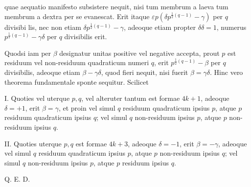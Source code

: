 quae aequatio manifesto subsistere nequit, nisi tum membrum a laeva tum membrum a dextra per se evanescat. Erit itaque $\varepsilon p(\delta p^{\frac12(q-1)}-\gamma)$ per $q$ divisibi%
%
lis, nec non etiam $\delta p^{\frac12(q-1)}-\gamma$, adeoque etiam propter $\delta\delta=1$, numerus $p^{\frac12(q-1)}-\gamma\delta$ per $q$ divisibilis erit.

Quodsi iam per $\beta$ designatur unitas positive vel negative accepta, prout $p$ est residuum vel non-residuum quadraticum numeri $q$, erit $p^{\frac12(q-1)}-\beta$ per $q$ divisibilis, adeoque etiam $\beta-\gamma\delta$, quod fieri nequit, nisi fuerit $\beta=\gamma\delta$. Hinc vero theorema fundamentale sponte sequitur. Scilicet

I. Quoties vel uterque $p,q$, vel alteruter tantum est formae $4k+1$, adeoque $\delta=+1$, erit $\beta=\gamma$, et proin vel simul $q$ residuum quadraticum ipsius $p$, atque $p$ residuum quadraticum ipsius $q$; vel simul $q$ non-residuum ipsius $p$, atque $p$ non-residuum ipsius $q$.

II. Quoties uterque $p,q$ est formae $4k+3$, adeoque $\delta=-1$, erit $\beta=-\gamma$, adeoque vel simul $q$ residuum quadraticum ipsius $p$, atque $p$ non-residuum ipsius $q$; vel simul $q$ non-residuum ipsius $p$, atque $p$ residuum ipsius $q$.

Q. E. D.

